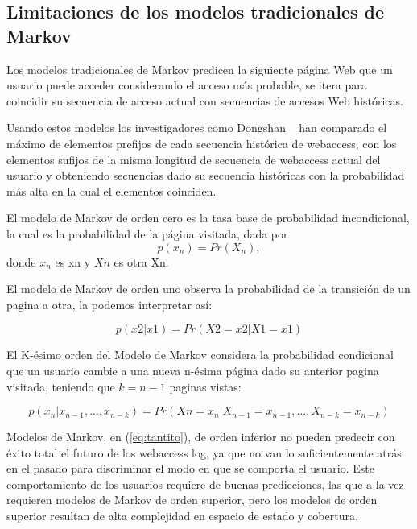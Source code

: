  
 
 \subsection{Limitaciones de los modelos tradicionales de Markov}
 
 
 Los modelos tradicionales de Markov predicen la siguiente página Web que un usuario puede acceder considerando el acceso más probable, se itera para  coincidir su secuencia de acceso actual con secuencias de accesos Web históricas.
 
 
 Usando estos modelos los investigadores como  Dongshan \etal~\cite{Dongshan2002} han comparado  el máximo de elementos  prefijos de cada secuencia histórica de webaccess,  con los elementos sufijos de la  misma longitud de secuencia de webaccess actual del usuario y obteniendo secuencias dado su secuencia históricas con la probabilidad más alta en la cual el elementos coinciden.
 
 El modelo de Markov de orden cero es la tasa base de probabilidad incondicional, la cual es la probabilidad de la página visitada, dada por
 \begin{equation}
p(x_n) = Pr(X_n),
 \end{equation}	
 donde $x_{n}$ es xn y $Xn$ es otra Xn.
 
 El modelo de Markov de orden uno observa la probabilidad de la transición de un pagina a otra, la podemos interpretar así:
 
 \begin{equation} 
	 p(x2 | x1) = Pr(X2 = x2 | X1 = x1) 
 \end{equation}	
 
 El K-ésimo orden del Modelo de Markov considera la probabilidad condicional que un usuario cambie a una nueva  n-ésima página  dado su anterior pagina visitada, teniendo que $k = n -1$ paginas vistas:
 
 \begin{equation}\label{eq:tantito}
p( x_{n} | x_{n-1},..., x_{n-k} ) = Pr(X{n} = x_{n} | X_{n-1} = x_{n-1},..., X_{n-k} = x_{n-k}) 
 \end{equation}


 
 
 Modelos de Markov, en (\ref{eq:tantito}), de orden inferior no pueden predecir con éxito total el futuro de los webaccess log, ya que no van lo suficientemente atrás en el pasado para discriminar el modo en que se comporta el usuario. Este comportamiento de los usuarios requiere de buenas predicciones, las que a la vez requieren modelos de Markov de orden superior, pero los modelos de orden superior resultan de alta complejidad en espacio de estado y cobertura. 
 
